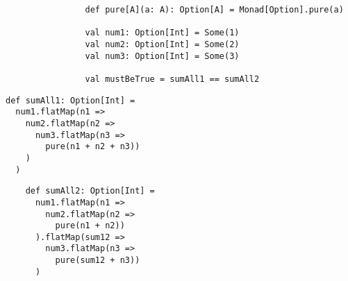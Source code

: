 \begin{algorithm}

    \begin{verbatim}
                def pure[A](a: A): Option[A] = Monad[Option].pure(a)
                
                val num1: Option[Int] = Some(1)
                val num2: Option[Int] = Some(2)
                val num3: Option[Int] = Some(3)
                
                val mustBeTrue = sumAll1 == sumAll2
    \end{verbatim}

    \begin{minipage}{0.40\textwidth}
    \begin{verbatim}
def sumAll1: Option[Int] = 
  num1.flatMap(n1 =>
    num2.flatMap(n2 =>
      num3.flatMap(n3 =>
        pure(n1 + n2 + n3))
    )
  )
    \end{verbatim}
    \end{minipage}
    \hspace{0.05\textwidth}
    \begin{minipage}{0.40\textwidth}
    \vspace{0.05\textwidth}
    \begin{verbatim}
    def sumAll2: Option[Int] =
      num1.flatMap(n1 =>
        num2.flatMap(n2 =>
          pure(n1 + n2))
      ).flatMap(sum12 =>
        num3.flatMap(n3 =>
          pure(sum12 + n3))
      )
    \end{verbatim}
    \end{minipage}

    \caption{Monad associativity law in Scala %
    \label{monad:laws:associativity}}
\end{algorithm}